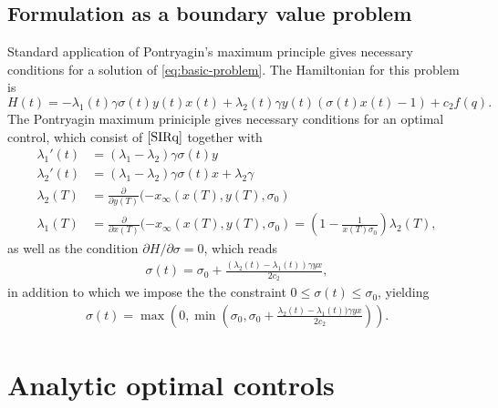 \documentclass[english,12pt]{article}
\begin{document}
\subsection{Formulation as a boundary value problem}
Standard application of Pontryagin's maximum principle gives necessary conditions
for a solution of \eqref{eq:basic-problem}.  The Hamiltonian for this problem is
$$
    H(t) = -\lambda_1(t) \gamma \sigma(t) y(t) x(t) + \lambda_2(t)\gamma y(t)(\sigma(t) x(t) - 1) + c_2 f(q).
$$
The Pontryagin maximum priniciple gives necessary conditions for an optimal control, which consist of $\eqref{SIRq}$
together with
\begin{subequations}\label{lambda-odes}
\begin{align} 
    \lambda_1'(t) & = (\lambda_1-\lambda_2)\gamma\sigma(t) y \\
    \lambda_2'(t) & = (\lambda_1-\lambda_2)\gamma\sigma(t) x + \lambda_2 \gamma \\
    \lambda_2(T) & = \frac{\partial }{\partial y(T)} (-x_\infty(x(T),y(T),\sigma_0) \\
    \lambda_1(T) & = \frac{\partial }{\partial x(T)} (-x_\infty(x(T),y(T),\sigma_0) = \left(1-\frac{1}{x(T)\sigma_0}\right)\lambda_2(T),
\end{align}
\end{subequations}
as well as the condition $\partial H/\partial \sigma = 0$, which reads
\begin{align*}
    \sigma(t) = \sigma_0 + \frac{(\lambda_2(t)-\lambda_1(t))\gamma y x}{2c_2},
\end{align*}
in addition to which we impose the the constraint $0\le \sigma(t) \le \sigma_0$, yielding
\begin{align} \label{eq:sigma-c2}
    \sigma(t) = \max\left(0,\min\left(\sigma_0,\sigma_0 + \frac{\lambda_2(t)-\lambda_1(t))\gamma y x}{2c_2}\right)\right).
\end{align}

\section{Analytic optimal controls\label{sec:analytic}}
\end{document}
